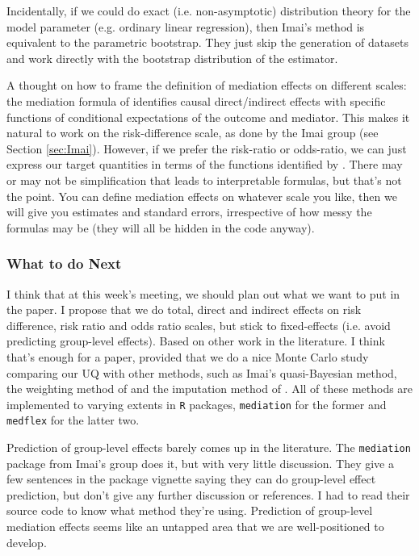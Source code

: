 \documentclass{report}
\begin{document}
Incidentally, if we could do exact (i.e. non-asymptotic) distribution theory for the model parameter (e.g. ordinary linear regression), then Imai's method is equivalent to the parametric bootstrap. They just skip the generation of datasets and work directly with the bootstrap distribution of the estimator.

A thought on how to frame the definition of mediation effects on different scales: the mediation formula of \citet{Pea12} identifies causal direct/indirect effects with specific functions of conditional expectations of the outcome and mediator. This makes it natural to work on the risk-difference scale, as done by the Imai group (see Section \ref{sec:Imai}). However, if we prefer the risk-ratio or odds-ratio, we can just express our target quantities in terms of the functions identified by \citet{Pea12}. There may or may not be simplification that leads to interpretable formulas, but that's not the point. You can define mediation effects on whatever scale you like, then we will give you estimates and standard errors, irrespective of how messy the formulas may be (they will all be hidden in the code anyway).

\subsubsection{What to do Next}

I think that at this week's meeting, we should plan out what we want to put in the paper. I propose that we do total, direct and indirect effects on risk difference, risk ratio and odds ratio scales, but stick to fixed-effects (i.e. avoid predicting group-level effects). Based on other work in the literature. I think that's enough for a paper, provided that we do a nice Monte Carlo study comparing our UQ with other methods, such as Imai's quasi-Bayesian method, the weighting method of \citet{Lan12} and the imputation method of \citet{Van12}. All of these methods are implemented to varying extents in \texttt{R} packages, \texttt{mediation} for the former and \texttt{medflex} for the latter two.

Prediction of group-level effects barely comes up in the literature. The \texttt{mediation} package from Imai's group does it, but with very little discussion. They give a few sentences in the package vignette saying they can do group-level effect prediction, but don't give any further discussion or references. I had to read their source code to know what method they're using. Prediction of group-level mediation effects seems like an untapped area that we are well-positioned to develop. 
\end{document}
